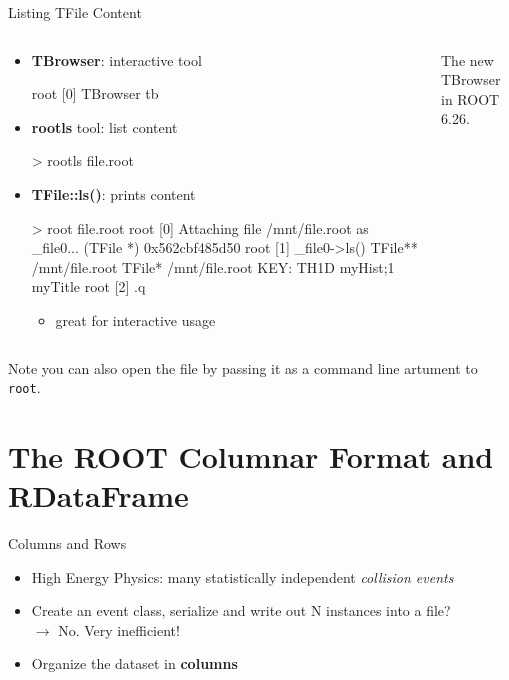 \documentclass[aspectratio=169]{beamer}
\newcommand{\myfigure}[2]{
    \begin{figure}
        \makebox[\textwidth]{%
            \texttt{[image: \#2]}
        }
    \end{figure}
}
\begin{document}
\begin{frame}[fragile]{Listing TFile Content}
\begin{columns}
    \begin{column}{0.43\textwidth}
    \begin{itemize}
    \item \textbf{TBrowser}: interactive tool
    \begin{myterminal}
root [0] TBrowser tb
    \end{myterminal}
    \item \textbf{rootls} tool: list content
    \begin{myterminal}
> rootls file.root
    \end{myterminal}
    \item \textbf{TFile::ls()}: prints content
    \begin{myterminaltiny}
> root file.root
root [0]
Attaching file /mnt/file.root as _file0...
(TFile *) 0x562cbf485d50
root [1] _file0->ls()
TFile**		/mnt/file.root
 TFile*		/mnt/file.root
  KEY: TH1D	myHist;1	myTitle
root [2] .q
    \end{myterminaltiny}
    \begin{itemize}
        \item great for interactive usage
    \end{itemize}
    \end{itemize}
    \end{column}
    \begin{column}{0.57\textwidth}
    \myfigure{1.1}{tbrowser.png}
    \begin{center}
        {\small The new TBrowser in ROOT 6.26.}
    \end{center}
    \end{column}
\end{columns}
\vspace{2mm}
Note you can also open the file by passing it as a command line artument to \texttt{root}.
\end{frame}

\section{The ROOT Columnar Format and RDataFrame}

\begin{frame}{Columns and Rows}
    \begin{itemize}
        \item High Energy Physics: many statistically independent \textit{collision events}
        \item Create an event class, serialize and write out N instances into a file?
            \\ $\rightarrow$ No. Very inefficient!
        \item Organize the dataset in \textbf{columns}
    \end{itemize}
    \myfigure{0.8}{column-representation.png}
\end{frame}
\end{document}
